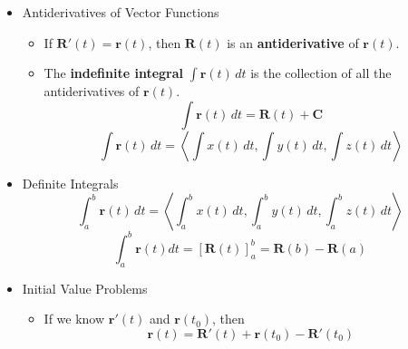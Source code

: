\documentclass[12pt]{article}
\newcommand{\ds}{\displaystyle}
\renewcommand{\vec}[1]{\mathbf{#1}}
\newcommand{\dvar}[1]{\,d{#1}}
\newcommand{\<}{\left<}
\renewcommand{\>}{\right>}
\begin{document}
    \begin{itemize}
      \item Antiderivatives of Vector Functions
        \begin{itemize}
          \item If $\vec{R}'(t)=\vec{r}(t)$, then $\vec{R}(t)$ is an \textbf{antiderivative} of $\vec{r}(t)$.
          \item The \textbf{indefinite integral} $\ds \int \vec{r}(t) \dvar{t}$ is the collection of all the antiderivatives of $\vec{r}(t)$.
          \[\ds\int \vec{r}(t) \dvar{t} = \vec{R}(t) + \vec{C}\]
          \[\ds\int \vec{r}(t) \dvar{t} = \<\int x(t) \dvar{t}, \int y(t) \dvar{t}, \int z(t) \dvar{t} \> \]
        \end{itemize}

      \item Definite Integrals
        \[\ds\int^b_a \vec{r}(t) \dvar{t} = \<\int^b_a x(t) \dvar{t}, \int^b_a y(t) \dvar{t}, \int^b_a z(t) \dvar{t} \> \]
        \[\int^b_a \vec{r}(t)dt = \left[\vec{R}(t)\right]^b_a=\vec{R}(b)-\vec{R}(a)\]
        
      \item Initial Value Problems
        \begin{itemize}
        \item If we know $\vec{r}'(t)$ and $\vec{r}(t_0)$, then \[\vec{r}(t)=\vec{R}'(t)+\vec{r}(t_0)-\vec{R}'(t_0)\]
        \end{itemize}
      

\end{itemize}
\end{document}
